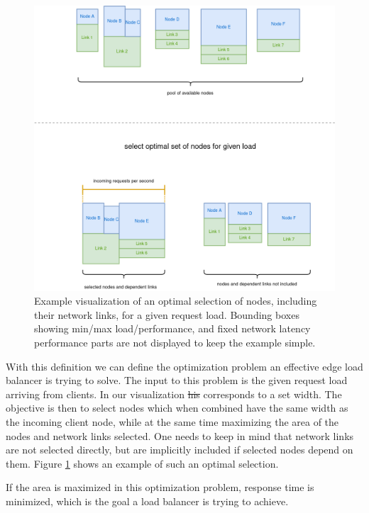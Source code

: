 \documentclass[draft,final]{vutinfth} %
\providecommand{\DIFaddtex}[1]{{\protect\color{blue}\uwave{#1}}} %
\providecommand{\DIFdeltex}[1]{{\protect\color{red}\sout{#1}}}                      %
\providecommand{\DIFaddbegin}{} %
\providecommand{\DIFaddend}{} %
\providecommand{\DIFdelbegin}{} %
\providecommand{\DIFdelend}{} %
\providecommand{\DIFadd}[1]{\texorpdfstring{\DIFaddtex{#1}}{#1}} %
\providecommand{\DIFdel}[1]{\texorpdfstring{\DIFdeltex{#1}}{}} %
\begin{document}
\begin{figure}
    \centering
    \includegraphics[width=14cm]{graphics/diagrams/lb_optimal_selection.png}
    \caption{Example visualization of an optimal selection of nodes, including their network links, for a given request load. Bounding boxes showing min/max load/performance, and fixed network latency performance parts are not displayed to keep the example simple.}
    \label{fig:lb_optimal_load}
\end{figure}

With this definition we can define the optimization problem an effective edge load balancer is trying to solve. The input to this problem is the given request load arriving from clients. In our visualization \DIFdelbegin \DIFdel{his }\DIFdelend \DIFaddbegin \DIFadd{this }\DIFaddend corresponds to a set width. The objective is then to select nodes which when combined have the same width as the incoming client node, while at the same time maximizing the area of the nodes and network links selected. One needs to keep in mind that network links are not selected directly, but are implicitly included if selected nodes depend on them. Figure \ref{fig:lb_optimal_load} shows an example of such an optimal selection.

If the area is maximized in this optimization problem, response time is minimized, which is the goal a load balancer is trying to achieve.
\end{document}
